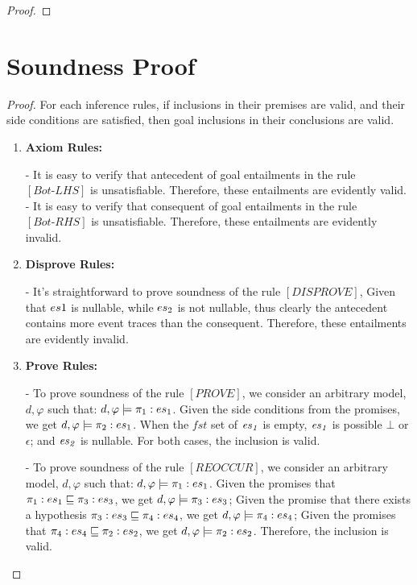 \documentclass[acmsmall,10pt,review]{acmart}
\newcommand{\es}{\textcolor{black}{\ensuremath{{es}}}}
\newcommand{\code}[1]{{\tt{\ensuremath{\m{#1}}}}}
\newcommand{\codeme}[1]{{\tt{\ensuremath{#1}}}}
\newcommand{\CONTAIN}{\sqsubseteq}
\newcommand{\m}{\mathit}
\begin{document}
{\begin{proof}
 \end{proof}


\section{Soundness Proof} 
 \label{proof:SoundnessProof}
 

 

\begin{proof}
For each inference rules, if inclusions in their premises are valid, and their side conditions are satisfied, then goal inclusions in their conclusions are valid.

\begin{enumerate}
\item \textbf{Axiom Rules:} 

- It is easy to verify that antecedent of goal entailments in the rule \codeme{[Bot\text{-}LHS]} is unsatisfiable. Therefore, these entailments are evidently valid.\\
- It is easy to verify that consequent of goal entailments in the rule \codeme{[Bot\text{-}RHS]} is unsatisfiable. Therefore, these entailments are evidently invalid.\\


\item \textbf{Disprove Rules:} 

- It's straightforward to prove soundness of the rule \codeme{[DISPROVE]}, Given that \codeme{ \es1} is nullable, while \codeme{ \es_2} is not nullable, thus clearly the antecedent contains more event traces than the consequent.  Therefore, these entailments are evidently invalid.\\


\item \textbf{Prove Rules:} 

- To prove soundness of the rule \code{[PROVE]}, we consider an arbitrary model, \codeme{d,  \varphi} such that:  \codeme{d,  \varphi \models  {\pi_1 : \es_1}}. Given the side conditions from the promises, we get \codeme{d,  \varphi \models {\pi_2 : \es_1}}. When the \code{\m{fst}} set of \code{\es_1} is empty, \code{\es_1} is possible \code{\bot} or \code{\epsilon}; and \code{\es_2} is nullable. For both cases, the inclusion is valid. 

- To prove soundness of the rule \codeme{[REOCCUR]}, we consider an arbitrary model, \codeme{d,  \varphi} such that:  \codeme{d,  \varphi \models  {\pi_1 : \es_1}}. Given the promises that  \codeme{\pi_1 : \es_1 \CONTAIN \pi_3 : \es_3}, we get \codeme{d,  \varphi \models {\pi_3 : \es_3}}; Given the promise that there exists a hypothesis \codeme{\pi_3 : \es_3 \CONTAIN  \pi_4 : \es_4}, we get \codeme{d,  \varphi \models {\pi_4 : \es_4}}; Given the promises that  \codeme{\pi_4 : \es_4 \CONTAIN \pi_2 : \es_2}, we get \codeme{d,  \varphi \models {\pi_2 : \es_2}}. Therefore,  the inclusion is valid. 
\\



\end{enumerate}
\end{proof}}
\end{document}
